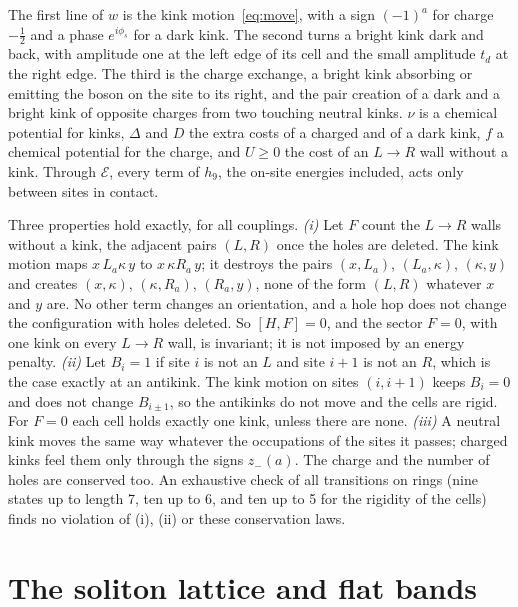 \documentclass[11pt]{article}
\begin{document}
The first line of $w$ is the kink motion~\eqref{eq:move}, with a sign $(-1)^a$ for charge $-\tfrac12$ and a phase $e^{i\phi_s}$ for a dark kink. The second turns a bright kink dark and back, with amplitude one at the left edge of its cell and the small amplitude $t_d$ at the right edge. The third is the charge exchange, a bright kink absorbing or emitting the boson on the site to its right, and the pair creation of a dark and a bright kink of opposite charges from two touching neutral kinks. $\nu$ is a chemical potential for kinks, $\Delta$ and $D$ the extra costs of a charged and of a dark kink, $f$ a chemical potential for the charge, and $U\ge0$ the cost of an $L\to R$ wall without a kink. Through $\mathcal E$, every term of $h_9$, the on-site energies included, acts only between sites in contact.

Three properties hold exactly, for all couplings.
\emph{(i)} Let $F$ count the $L\to R$ walls without a kink, the adjacent pairs $(L,R)$ once the holes are deleted. The kink motion maps $x\,L_a\kappa\,y$ to $x\,\kappa R_a\,y$; it destroys the pairs $(x,L_a)$, $(L_a,\kappa)$, $(\kappa,y)$ and creates $(x,\kappa)$, $(\kappa,R_a)$, $(R_a,y)$, none of the form $(L,R)$ whatever $x$ and $y$ are. No other term changes an orientation, and a hole hop does not change the configuration with holes deleted. So $[H,F]=0$, and the sector $F=0$, with one kink on every $L\to R$ wall, is invariant; it is not imposed by an energy penalty.
\emph{(ii)} Let $B_i=1$ if site $i$ is not an $L$ and site $i+1$ is not an $R$, which is the case exactly at an antikink. The kink motion on sites $(i,i+1)$ keeps $B_i=0$ and does not change $B_{i\pm1}$, so the antikinks do not move and the cells are rigid. For $F=0$ each cell holds exactly one kink, unless there are none.
\emph{(iii)} A neutral kink moves the same way whatever the occupations of the sites it passes; charged kinks feel them only through the signs $z_-(a)$.
The charge and the number of holes are conserved too. An exhaustive check of all transitions on rings (nine states up to length 7, ten up to 6, and ten up to 5 for the rigidity of the cells) finds no violation of (i), (ii) or these conservation laws. %

\section{The soliton lattice and flat bands}\label{sec:lattice}
\end{document}
